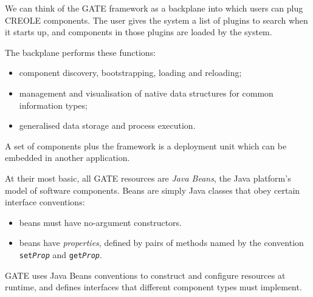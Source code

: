 \label{sec:creole-model:beans}

We can think of the GATE framework as a backplane into
which users can plug CREOLE components.
The user gives the system a list of plugins to search when it starts up,
and components in those plugins are loaded by the system.

The backplane performs these functions:
\begin{itemize}
\item
component discovery, bootstrapping, loading and reloading;
\item
management and visualisation of
native data structures for common information types;
\item
generalised data storage and process execution.
\end{itemize}

A set of components plus the framework is a deployment unit which can be
embedded in another application.

At their most basic, all GATE resources are {\em Java Beans}, the Java
platform's model of software components. Beans are simply Java classes that
obey certain interface conventions:
\begin{itemize}
\item
beans must have no-argument constructors.
%
\item
beans have \emph{properties}, defined by pairs of methods named by the
convention \texttt{set\emph{Prop}} and \texttt{get\emph{Prop}}.
\end{itemize}
%

GATE uses Java Beans conventions to construct and configure resources at
runtime, and defines interfaces that different component types must implement.


